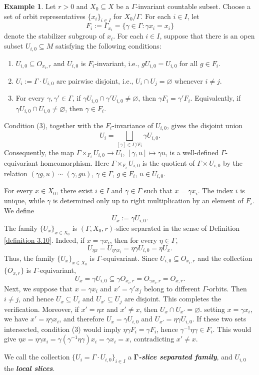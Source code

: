 \documentclass[pdflatex]{sn-jnl}
\theoremstyle{plain}
\theoremstyle{definition}
\newtheorem{example}[theorem]{Example}
\begin{document}
\begin{example}\label{example:slice-separated-sets}
Let $r>0$ and $X_0\subseteq X$ be a $\Gamma$-invariant
countable subset. Choose a set of orbit representatives
$\{x_i\}_{i\in I}$ for $X_0/\Gamma$. For each $i\in I$, let
$$F_i:=\Gamma_{x_i}
=\{\gamma\in\Gamma:\gamma x_i=x_i\}$$
denote the stabilizer subgroup of $x_i$.
For each $i\in I$, suppose that there is an open subset
$U_{i,0}\subseteq M$ satisfying the following conditions:
\begin{enumerate}
\item[(1)] $U_{i,0}\subseteq O_{x_i,r}$ and $U_{i,0}$ is
$F_i$-invariant, i.e.,
$gU_{i,0}=U_{i,0}$ for all $g\in F_i$.
\item[(2)] $U_i:=\Gamma \cdot U_{i,0}$ are pairwise disjoint, i.e., $U_i \cap U_j=\varnothing$ whenever $i\neq j$.
\item[(3)] For every $\gamma,\gamma'\in\Gamma$, if $\gamma U_{i,0}\cap \gamma' U_{i,0}\neq\varnothing$, then $\gamma F_i=\gamma'F_i$. Equivalently, if $\gamma U_{i,0}\cap U_{i,0}\neq\varnothing$, then $\gamma\in F_i$.
\end{enumerate}
Condition (3), together
with the $F_i$-invariance of $U_{i,0}$, gives the disjoint union
\[U_i=\bigsqcup_{[\gamma]\in\Gamma/F_i}\gamma U_{i,0}.\]
Consequently, the map
$\Gamma\times_{F_i}U_{i,0}
\rightarrow U_i$,
$[\gamma,u]\mapsto\gamma u$,
is a well-defined $\Gamma$-equivariant homeomorphism. Here
$\Gamma\times_{F_i}U_{i,0}$ is the quotient of
$\Gamma\times U_{i,0}$ by the relation
$(\gamma g,u)\sim(\gamma,gu)$,
$\gamma\in\Gamma$, $g\in F_i$, $u\in U_{i,0}$.

For every $x\in X_0$, there exist $i\in I$ and 
$\gamma\in\Gamma$ such that
$x=\gamma x_i$.
The index $i$ is unique, while $\gamma$ is determined only up to right
multiplication by an element of $F_i$. We define
\[U_x:=\gamma U_{i,0}.\]
The family
$\{U_x\}_{x\in X_0}$ is $(\Gamma,X_0,r)$-slice separated in the sense
of Definition \ref{definition 3.10}.
Indeed, if $x=\gamma x_i$, then for every $\eta\in\Gamma$, $$U_{\eta x} =U_{\eta\gamma x_i}=\eta\gamma U_{i,0}=\eta U_x.$$ Thus, the family $\{U_x\}_{x\in X_0}$ is $\Gamma$-equivariant. Since $U_{i,0}\subseteq O_{x_i,r}$ and the collection $\{O_{x,r}\}$ is $\Gamma$-equivariant, $$U_x=\gamma U_{i,0}\subseteq\gamma O_{x_i,r}=O_{\gamma x_i,r}=O_{x,r}.$$ Next, we
suppose that $x=\gamma x_i$ and $x'=\gamma' x_j$ belong to different $\Gamma$-orbits. Then $i\neq j$, and hence $U_x\subseteq U_i$ and $U_{x'}\subseteq U_j$ are disjoint. This completes the verification. 
Moreover, if $x'=\eta x$ and $x'\neq x$, then $U_x\cap U_{x'}=\varnothing$. setting $x=\gamma x_i$, we have $x'=\eta\gamma x_i$, and therefore
$U_x=\gamma U_{i,0}$ and $U_{x'}=\eta\gamma U_{i,0}$. If these two sets
intersected, condition (3) would imply $\eta\gamma F_i=\gamma F_i$, hence
$\gamma^{-1}\eta\gamma\in F_i$. This would give
$\eta x=\eta\gamma x_i=\gamma(\gamma^{-1}\eta\gamma)x_i=\gamma x_i=x$,
contradicting $x'\neq x$.

We call the collection 
$\{U_i=\Gamma\cdot U_{i,0}\}_{i\in I}$
a \emph{$\boldsymbol{\Gamma}$\textbf{-slice separated family}}, and 
$U_{i,0}$ the \emph{\textbf{local slices}}.
\end{example}
\end{document}
